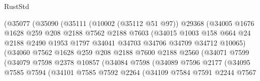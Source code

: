 \begin{lexlean}{RustStd}
\begin{coremodule}
                        (@35077
                          (@35090
                            (@35111
                              (@10002 (@35112 @51 @97))
                              @29368
                              (@34005
                                @1676
                                @1628
                                @259
                                @208
                                @2188
                                @7562
                                @2188
                                @7603
                                (@34015
                                  @1003
                                  @158
                                  @664
                                  @24
                                  @2188
                                  @2490
                                  @1953
                                  @1797
                                  @34041
                                  @34703
                                  @34706
                                  @34709
                                  @34712
                                  @10065)
                                (@34060
                                  @7562
                                  @1628
                                  @259
                                  @208
                                  @2188
                                  @7600
                                  @2188
                                  @2560
                                  (@34071
                                    @7599
                                    (@34079
                                      @7598
                                      @2378
                                      @10857
                                      (@34084
                                        @7598
                                        (@34089
                                          @7596
                                          @2177
                                          (@34095
                                            @7585
                                            @7594
                                            (@34101
                                              @7585
                                              @7592
                                              @2264
                                              (@34109
                                                @7584
                                                @7591
                                                @2244
                                                @7567

\end{coremodule}
\end{lexlean}
